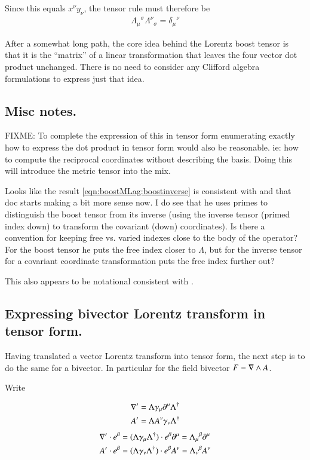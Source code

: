 Since this equals $x^\nu y_\nu$, the tensor rule must therefore be
\begin{align}\label{eqn:boostMLag:boostinverse}
{\Lambda_{\mu}}^{\sigma} {\Lambda^{\nu}}_{\sigma} = {\delta_\mu}^\nu
\end{align}

After a somewhat long path, the core idea behind the Lorentz boost tensor
is that it is the ``matrix'' of a linear transformation that leaves
the four vector dot product unchanged.  There is no need to consider
any Clifford algebra formulations to express just that idea.

\subsection{Misc notes. }

FIXME: To complete
the expression of this in tensor form enumerating exactly how to express
the dot product in tensor form would also be reasonable.  ie: how to compute
the reciprocal coordinates without describing the basis.  Doing this
will introduce the metric tensor into the mix.

Looks like the result \ref{eqn:boostMLag:boostinverse}
is consistent with \cite{MinahanTensors} and
that doc starts making a bit more sense now.  I do see that
he uses primes to distinguish the boost tensor from its inverse (using
the inverse tensor (primed index down) to transform the covariant (down)
coordinates).  Is there a convention for keeping free vs. varied indexes
close to the body of the operator?  For the boost tensor he puts the free
index closer to $\Lambda$, but for the inverse tensor for a covariant
coordinate transformation puts the free index further out?

This also appears to be notational consistent with \cite{SpenceTensors}.

\subsection{Expressing bivector Lorentz transform in tensor form. }

Having translated a vector Lorentz transform into tensor form, the next step is to do the same for
a bivector.  In particular for the field bivector $F = \nabla \wedge A$.

Write

\begin{align*}
\nabla' &= \Lambda \gamma_\mu \partial^\mu \Lambda^\dagger \\
A' &= \Lambda A^\nu \gamma_\nu \Lambda^\dagger \\
\end{align*}
\begin{align*}
\nabla' \cdot e^\beta &= (\Lambda \gamma_\mu \Lambda^\dagger) \cdot e^\beta \partial^\mu = {\Lambda_\mu}^\beta \partial^\mu \\
A' \cdot e^\beta &= (\Lambda \gamma_\nu \Lambda^\dagger) \cdot e^\beta A^\nu = {\Lambda_\nu}^\beta A^\nu \\
\end{align*}

